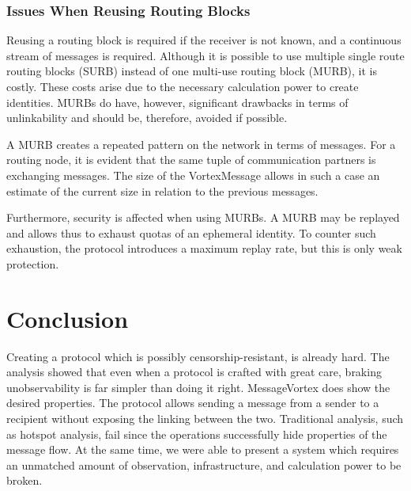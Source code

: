 \documentclass[10pt,journal,compsoc,twocolumn,twoside]{IEEEtran}
\begin{document}
\subsubsection{Issues When Reusing Routing Blocks}
Reusing a routing block is required if the receiver is not known, and a continuous stream of messages is required. Although it is possible to use multiple single route routing blocks (SURB) instead of one multi-use routing block (MURB), it is costly. These costs arise due to the necessary calculation power to create identities. MURBs do have, however, significant drawbacks in terms of unlinkability and should be, therefore, avoided if possible.

A MURB creates a repeated pattern on the network in terms of messages. For a routing node, it is evident that the same tuple of communication partners is exchanging messages. The size of the VortexMessage allows in such a case an estimate of the current size in relation to the previous messages.

Furthermore, security is affected when using MURBs. A MURB may be replayed and allows thus to exhaust quotas of an ephemeral identity. To counter such exhaustion, the protocol introduces a maximum replay rate, but this is only weak protection.

\section{Conclusion}
Creating a protocol which is possibly censorship-resistant, is already hard. The analysis showed that even when a protocol is crafted with great care, braking unobservability is far simpler than doing it right. MessageVortex does show the desired properties. The protocol allows sending a message from a sender to a recipient without exposing the linking between the two. Traditional analysis, such as hotspot analysis, fail since the operations successfully hide properties of the message flow. At the same time, we were able to present a system which requires an unmatched amount of observation, infrastructure, and calculation power to be broken.
\end{document}
